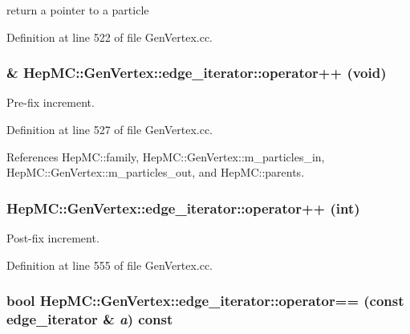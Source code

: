 return a pointer to a particle 



Definition at line 522 of file Gen\-Vertex.cc.
\subsubsection{ \& Hep\-MC::Gen\-Vertex::edge\_\-iterator::operator++ (void)}\label{classHepMC_1_1GenVertex_1_1edge__iterator_f3c926b96624a094b8b9c935d9f769b3}


Pre-fix increment. 



Definition at line 527 of file Gen\-Vertex.cc.

References Hep\-MC::family, Hep\-MC::Gen\-Vertex::m\_\-particles\_\-in, Hep\-MC::Gen\-Vertex::m\_\-particles\_\-out, and Hep\-MC::parents.
\subsubsection{ Hep\-MC::Gen\-Vertex::edge\_\-iterator::operator++ (int)}\label{classHepMC_1_1GenVertex_1_1edge__iterator_9409a50bd1ebe8bc7105e1bd54f21cf1}


Post-fix increment. 



Definition at line 555 of file Gen\-Vertex.cc.
\subsubsection{\setlength{\rightskip}{0pt plus 5cm}bool Hep\-MC::Gen\-Vertex::edge\_\-iterator::operator== (const {\bf edge\_\-iterator} \& {\em a}) const\hspace{0.3cm}{\tt  [inline]}}\label{classHepMC_1_1GenVertex_1_1edge__iterator_79027c51eae629861413b6950df8b43b}


